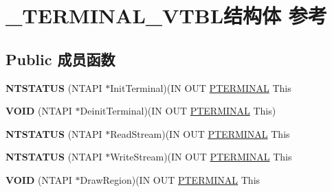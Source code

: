 \hypertarget{struct___t_e_r_m_i_n_a_l___v_t_b_l}{}\section{\+\_\+\+T\+E\+R\+M\+I\+N\+A\+L\+\_\+\+V\+T\+B\+L结构体 参考}
\label{struct___t_e_r_m_i_n_a_l___v_t_b_l}
\subsection*{Public 成员函数}
\begin{DoxyCompactItemize}
\item 
\mbox{\label{struct___t_e_r_m_i_n_a_l___v_t_b_l_a936ef6781ac20ec15bbe70708fc79ab1}} 
{\bfseries N\+T\+S\+T\+A\+T\+US} (N\+T\+A\+PI $\ast$Init\+Terminal)(IN O\+UT \hyperlink{struct___t_e_r_m_i_n_a_l}{P\+T\+E\+R\+M\+I\+N\+AL} This
\item 
\mbox{\label{struct___t_e_r_m_i_n_a_l___v_t_b_l_a8bad7aa01f13be6cfccbdabf3b5830e7}} 
{\bfseries V\+O\+ID} (N\+T\+A\+PI $\ast$Deinit\+Terminal)(IN O\+UT \hyperlink{struct___t_e_r_m_i_n_a_l}{P\+T\+E\+R\+M\+I\+N\+AL} This)
\item 
\mbox{\label{struct___t_e_r_m_i_n_a_l___v_t_b_l_a7a838dd8c7150be841223b50b775f026}} 
{\bfseries N\+T\+S\+T\+A\+T\+US} (N\+T\+A\+PI $\ast$Read\+Stream)(IN O\+UT \hyperlink{struct___t_e_r_m_i_n_a_l}{P\+T\+E\+R\+M\+I\+N\+AL} This
\item 
\mbox{\label{struct___t_e_r_m_i_n_a_l___v_t_b_l_a6fadef3149495cb14d5398ade32391f2}} 
{\bfseries N\+T\+S\+T\+A\+T\+US} (N\+T\+A\+PI $\ast$Write\+Stream)(IN O\+UT \hyperlink{struct___t_e_r_m_i_n_a_l}{P\+T\+E\+R\+M\+I\+N\+AL} This
\item 
\mbox{\label{struct___t_e_r_m_i_n_a_l___v_t_b_l_af58c89d2a981a8f80f5634b8c575cdfa}} 
{\bfseries V\+O\+ID} (N\+T\+A\+PI $\ast$Draw\+Region)(IN O\+UT \hyperlink{struct___t_e_r_m_i_n_a_l}{P\+T\+E\+R\+M\+I\+N\+AL} This
\item 
\mbox{\label{struct___t_e_r_m_i_n_a_l___v_t_b_l_af22765c1f23cf4840b394989409ba9c0}} 

\end{DoxyCompactItemize}
